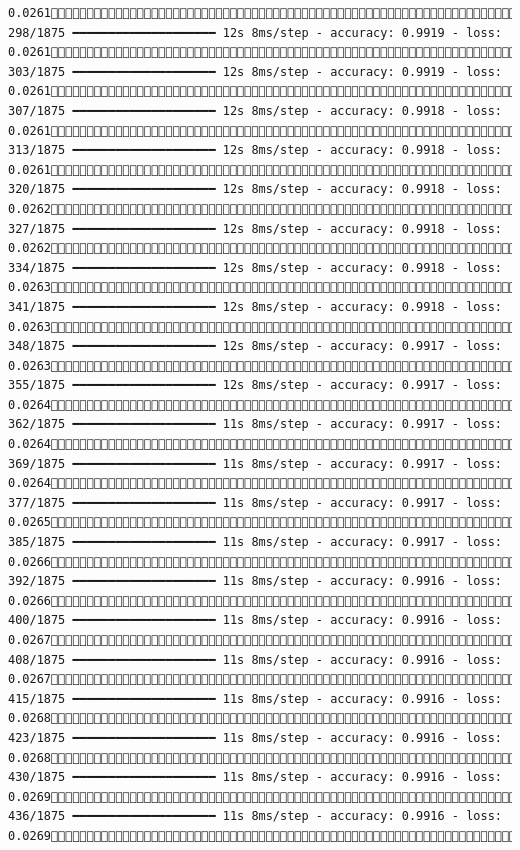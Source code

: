 \documentclass[
  letterpaper,
  DIV=11,
  numbers=noendperiod]{scrreprt}
\begin{document}
\begin{verbatim}
0.0261 298/1875 ━━━━━━━━━━━━━━━━━━━━ 12s 8ms/step - accuracy: 0.9919 - loss: 0.0261 303/1875 ━━━━━━━━━━━━━━━━━━━━ 12s 8ms/step - accuracy: 0.9919 - loss: 0.0261 307/1875 ━━━━━━━━━━━━━━━━━━━━ 12s 8ms/step - accuracy: 0.9918 - loss: 0.0261 313/1875 ━━━━━━━━━━━━━━━━━━━━ 12s 8ms/step - accuracy: 0.9918 - loss: 0.0261 320/1875 ━━━━━━━━━━━━━━━━━━━━ 12s 8ms/step - accuracy: 0.9918 - loss: 0.0262 327/1875 ━━━━━━━━━━━━━━━━━━━━ 12s 8ms/step - accuracy: 0.9918 - loss: 0.0262 334/1875 ━━━━━━━━━━━━━━━━━━━━ 12s 8ms/step - accuracy: 0.9918 - loss: 0.0263 341/1875 ━━━━━━━━━━━━━━━━━━━━ 12s 8ms/step - accuracy: 0.9918 - loss: 0.0263 348/1875 ━━━━━━━━━━━━━━━━━━━━ 12s 8ms/step - accuracy: 0.9917 - loss: 0.0263 355/1875 ━━━━━━━━━━━━━━━━━━━━ 12s 8ms/step - accuracy: 0.9917 - loss: 0.0264 362/1875 ━━━━━━━━━━━━━━━━━━━━ 11s 8ms/step - accuracy: 0.9917 - loss: 0.0264 369/1875 ━━━━━━━━━━━━━━━━━━━━ 11s 8ms/step - accuracy: 0.9917 - loss: 0.0264 377/1875 ━━━━━━━━━━━━━━━━━━━━ 11s 8ms/step - accuracy: 0.9917 - loss: 0.0265 385/1875 ━━━━━━━━━━━━━━━━━━━━ 11s 8ms/step - accuracy: 0.9917 - loss: 0.0266 392/1875 ━━━━━━━━━━━━━━━━━━━━ 11s 8ms/step - accuracy: 0.9916 - loss: 0.0266 400/1875 ━━━━━━━━━━━━━━━━━━━━ 11s 8ms/step - accuracy: 0.9916 - loss: 0.0267 408/1875 ━━━━━━━━━━━━━━━━━━━━ 11s 8ms/step - accuracy: 0.9916 - loss: 0.0267 415/1875 ━━━━━━━━━━━━━━━━━━━━ 11s 8ms/step - accuracy: 0.9916 - loss: 0.0268 423/1875 ━━━━━━━━━━━━━━━━━━━━ 11s 8ms/step - accuracy: 0.9916 - loss: 0.0268 430/1875 ━━━━━━━━━━━━━━━━━━━━ 11s 8ms/step - accuracy: 0.9916 - loss: 0.0269 436/1875 ━━━━━━━━━━━━━━━━━━━━ 11s 8ms/step - accuracy: 0.9916 - loss: 0.0269 
\end{verbatim}
\end{document}
